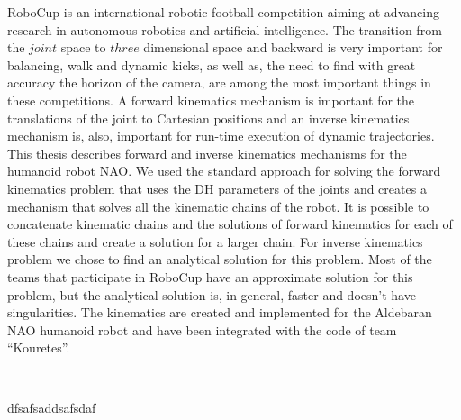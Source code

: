 

\begin{abstractslong}        %
RoboCup is an international robotic football competition aiming at advancing research in autonomous robotics and artificial intelligence. The transition from the \(joint\) space to \(three\) dimensional space and backward is very important for balancing, walk and dynamic kicks, as well as, the need to find with great accuracy the horizon of the camera, are among the most important things in these competitions. A forward kinematics mechanism is important for the translations of the joint to Cartesian positions and an inverse kinematics mechanism is, also, important for run-time execution of dynamic trajectories. This thesis describes forward and inverse kinematics mechanisms for the humanoid robot NAO. We used the standard approach for solving the forward kinematics problem that uses the DH parameters of the joints and creates a mechanism that solves all the kinematic chains of the robot. It is possible to concatenate kinematic chains and the solutions of forward kinematics for each of these chains and create a solution for a larger chain. For inverse kinematics problem we chose to  find an analytical solution for this problem. Most of the teams that participate in RoboCup have an approximate solution for this problem, but the analytical solution is, in general, faster and doesn't have singularities. The kinematics are created and implemented for the Aldebaran NAO humanoid robot and have been integrated with the code of team ``Kouretes''.




\end{abstractslong}
\newpage
\ 


 \begin{abstractsgreeklong}
{\gr dfsafsaddsafsdaf}
 \end{abstractsgreeklong}

\newpage
\ 




